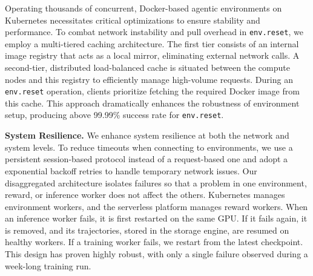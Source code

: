 Operating thousands of concurrent, Docker-based agentic environments on Kubernetes necessitates critical optimizations to ensure stability and performance. 
To combat network instability and pull overhead in \texttt{env.reset}, we employ a multi-tiered caching architecture. The first tier consists of an internal image registry that acts as a local mirror, eliminating external network calls. A second-tier, distributed load-balanced cache is situated between the compute nodes and this registry to efficiently manage high-volume requests.
During an \texttt{env.reset} operation, clients prioritize fetching the required Docker image from this cache. This approach dramatically enhances the robustness of environment setup, producing above 99.99\% success rate for \texttt{env.reset}.



\noindent\textbf{System Resilience.} 
We enhance system resilience at both the network and system levels. To reduce timeouts when connecting to environments, we use a persistent session-based protocol instead of a request-based one and adopt a exponential backoff retries to handle temporary network issues. Our disaggregated architecture isolates failures so that a problem in one environment, reward, or inference worker does not affect the others. Kubernetes manages environment workers, and the serverless platform manages reward workers. When an inference worker fails, it is first restarted on the same GPU. If it fails again, it is removed, and its trajectories, stored in the storage engine, are resumed on healthy workers. If a training worker fails, we restart from the latest checkpoint. This design has proven highly robust, with only a single failure observed during a week-long training run.




